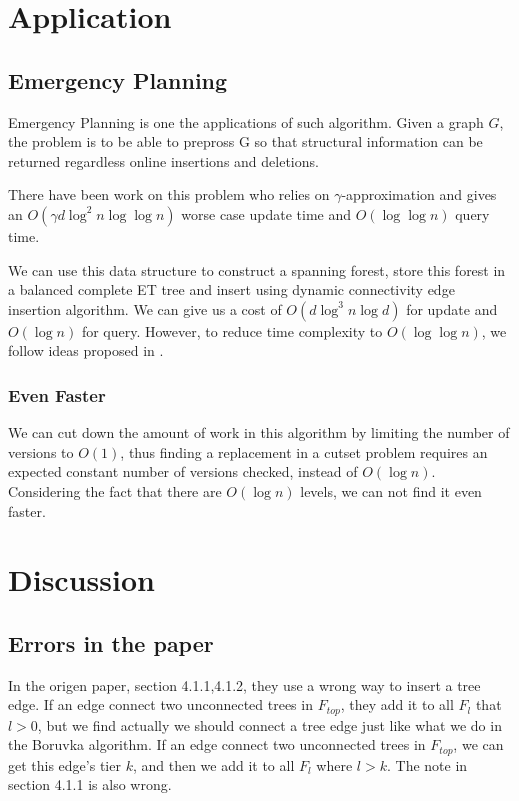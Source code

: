\documentclass[conference,compsoc]{IEEEtran}
\begin{document}
\section{Application}
	\subsection{Emergency Planning}
		\par Emergency Planning is one the applications of such algorithm. Given a graph $G$, the problem is to be able to prepross G so that structural information can be returned regardless online insertions and deletions.
		\par There have been work on this problem\cite{abboud2014popular} who relies on $\gamma$-approximation and gives an $O(\gamma d \log^2n\log\log n)$ worse case update time and $O(\log \log n)$ query time.
		\par We can use this data structure to construct a spanning forest, store this forest in a balanced complete ET tree and insert using dynamic connectivity edge insertion algorithm. 
		We can give us a cost of $O(d\log^3 n \log d)$ for update and $O(\log n)$ for query.
		However, to reduce time complexity to $O(\log \log n)$, we follow ideas proposed in \cite{abboud2014popular}. 
	\subsubsection{Even Faster}
		\par We can cut down the amount of work in this algorithm by limiting the number of versions to $O(1)$, thus finding a replacement in a cutset problem requires an expected constant number of versions checked, instead of $O(\log n)$. Considering the fact that there are $O(\log n)$ levels, we can not find it even faster.
\section{Discussion}
	\subsection{Errors in the paper}
	In the origen paper, section 4.1.1,4.1.2, they use a wrong way to insert a tree edge. If an edge connect two unconnected trees in $F_{top}$, they add it to all $F_l$ that $l > 0$, but we find actually we should connect a tree edge just like what we do in the Boruvka algorithm. If an edge connect two unconnected trees in $F_{top}$, we can get this edge's tier $k$, and then we add it to all $F_l$ where $l > k$. The note in section 4.1.1 is also wrong.
\end{document}
